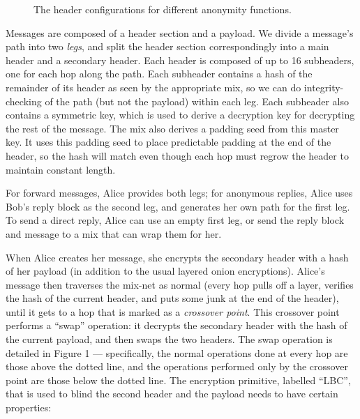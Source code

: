 \documentclass[11pt]{IEEEtran}
\begin{document}
\begin{figure}
\begin{center}
\caption{The header configurations for different anonymity functions.} 
\end{center}
\end{figure}

Messages are composed of a header section and a payload. We divide
a message's path into two \emph{legs}, and split the header section
correspondingly into a main header and a secondary header. Each header
is composed of up to 16 subheaders, one for each hop along the path.
Each subheader contains a hash of the remainder of its header as
seen by the appropriate mix, so we can do
integrity-checking of the path (but not the payload) within each leg.
Each subheader also contains a symmetric key, which is used to derive a
decryption key for decrypting the rest of the message. The mix also
derives a padding seed from this master key. It uses this padding seed
to place predictable padding at the end of the header, so the hash will
match even though each hop must regrow the header to maintain constant
length.

For forward messages, Alice provides both legs; for anonymous replies, Alice
uses Bob's reply block as the second leg, and generates her own path
for the first leg.  To send a direct reply, Alice can use an empty
first leg, or send the reply block and message to a mix that can wrap
them for her.

When Alice creates her message, she encrypts the secondary header
with a hash of her payload (in addition to the usual layered onion
encryptions). Alice's message then traverses the mix-net as normal (every
hop pulls off a layer, verifies the hash of the current header,
and puts some junk at the end of the header), until it gets to a
hop that is marked as a \emph{crossover point}. This crossover point
performs a ``swap'' operation: it decrypts the secondary header with
the hash of the current payload, and then swaps the two headers. The
swap operation is detailed in Figure 1 --- specifically, the normal
operations done at every hop are those above the dotted line, and the
operations performed only by the crossover point are those below
the dotted line. The encryption primitive, labelled ``LBC'', that is
used to blind the second header and the payload needs to have certain
properties:
\end{document}
